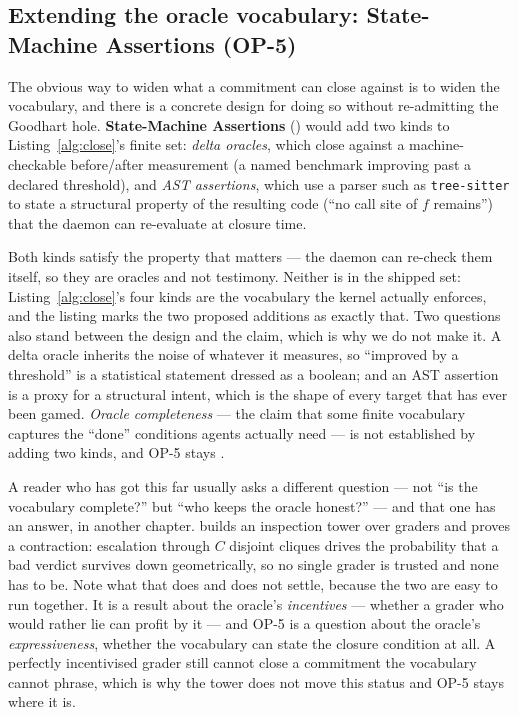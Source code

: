 \documentclass[11pt,a4paper]{article}
\theoremstyle{definition}
\theoremstyle{remark}
\begin{document}
\subsection{Extending the oracle vocabulary: State-Machine Assertions (OP-5)}

The obvious way to widen what a commitment can close against is to widen the
vocabulary, and there is a concrete design for doing so without re-admitting the
Goodhart hole. \textbf{State-Machine Assertions} (\Designed) would add two kinds to
Listing~\ref{alg:close}'s finite set: \emph{delta oracles}, which close against a
machine-checkable before/after measurement (a named benchmark improving past a
declared threshold), and \emph{AST assertions}, which use a parser such as
\texttt{tree-sitter} to state a structural property of the resulting code (``no call
site of $f$ remains'') that the daemon can re-evaluate at closure time.

Both kinds satisfy the property that matters --- the daemon can re-check them
itself, so they are oracles and not testimony. Neither is in the shipped set:
Listing~\ref{alg:close}'s four kinds are the vocabulary the kernel actually
enforces, and the listing marks the two proposed additions as exactly that. Two
questions also stand between the design and the claim, which is why we do not make
it. A delta oracle inherits the noise of whatever it measures, so ``improved by a
threshold'' is a statistical statement dressed as a boolean; and an AST assertion is
a proxy for a structural intent, which is the shape of every target that has ever
been gamed. \emph{Oracle completeness} --- the claim that some finite vocabulary
captures the ``done'' conditions agents actually need --- is not established by
adding two kinds, and OP-5 stays \Open{}.

A reader who has got this far usually asks a different question --- not ``is the
vocabulary complete?'' but ``who keeps the oracle honest?'' --- and that one has an
answer, in another chapter.  builds an
inspection tower over graders and proves a contraction: escalation through $C$
disjoint cliques drives the probability that a bad verdict survives down
geometrically, so no single grader is trusted and none has to be. Note what that
does and does not settle, because the two are easy to run together. It is a result
about the oracle's \emph{incentives} --- whether a grader who would rather lie can
profit by it --- and OP-5 is a question about the oracle's \emph{expressiveness},
whether the vocabulary can state the closure condition at all. A perfectly
incentivised grader still cannot close a commitment the vocabulary cannot phrase,
which is why the tower does not move this status and OP-5 stays where it is.
\end{document}
